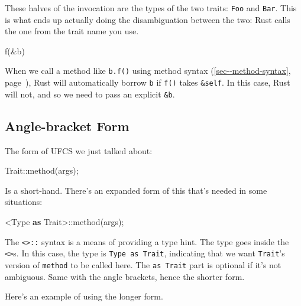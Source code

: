 \documentclass[a4paper,]{book}
\renewcommand*{\hyperlink}[2]{%
 #2 (\autoref{#1}, page~\pageref{#1})}
\newenvironment{Shaded}{\begin{snugshade}}{\end{snugshade}}
\newcommand{\KeywordTok}[1]{\textcolor[rgb]{0.13,0.29,0.53}{\textbf{{#1}}}}
\newcommand{\NormalTok}[1]{{#1}}
\begin{document}
These halves of the invocation are the types of the two traits:
\texttt{Foo} and \texttt{Bar}. This is what ends up actually doing the
disambiguation between the two: Rust calls the one from the trait name
you use.

\begin{Shaded}
\begin{Highlighting}[]
\NormalTok{f(&b)}
\end{Highlighting}
\end{Shaded}

When we call a method like \texttt{b.f()} using
\protect\hyperlink{sec--method-syntax}{method syntax}, Rust will
automatically borrow \texttt{b} if \texttt{f()} takes \texttt{\&self}.
In this case, Rust will not, and so we need to pass an explicit
\texttt{\&b}.

\subsection{Angle-bracket Form}\label{angle-bracket-form}

The form of UFCS we just talked about:

\begin{Shaded}
\begin{Highlighting}[]
\NormalTok{Trait::method(args);}
\end{Highlighting}
\end{Shaded}

Is a short-hand. There's an expanded form of this that's needed in some
situations:

\begin{Shaded}
\begin{Highlighting}[]
\NormalTok{<Type }\KeywordTok{as} \NormalTok{Trait>::method(args);}
\end{Highlighting}
\end{Shaded}

The \texttt{\textless{}\textgreater{}::} syntax is a means of providing
a type hint. The type goes inside the
\texttt{\textless{}\textgreater{}}s. In this case, the type is
\texttt{Type\ as\ Trait}, indicating that we want \texttt{Trait}'s
version of \texttt{method} to be called here. The \texttt{as\ Trait}
part is optional if it's not ambiguous. Same with the angle brackets,
hence the shorter form.

Here's an example of using the longer form.
\end{document}
